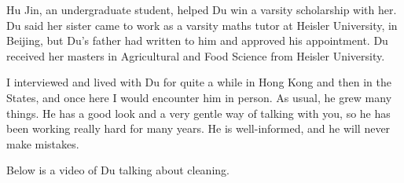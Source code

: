 \documentclass{article}
\begin{document}
Hu Jin, an undergraduate student, helped Du win a varsity scholarship with her. Du said her sister came to work as a varsity maths tutor at Heisler University, in Beijing, but Du's father had written to him and approved his appointment. Du received her masters in Agricultural and Food Science from Heisler University.

I interviewed and lived with Du for quite a while in Hong Kong and then in the States, and once here I would encounter him in person. As usual, he grew many things. He has a good look and a very gentle way of talking with you, so he has been working really hard for many years. He is well-informed, and he will never make mistakes.

Below is a video of Du talking about cleaning.
\end{document}
